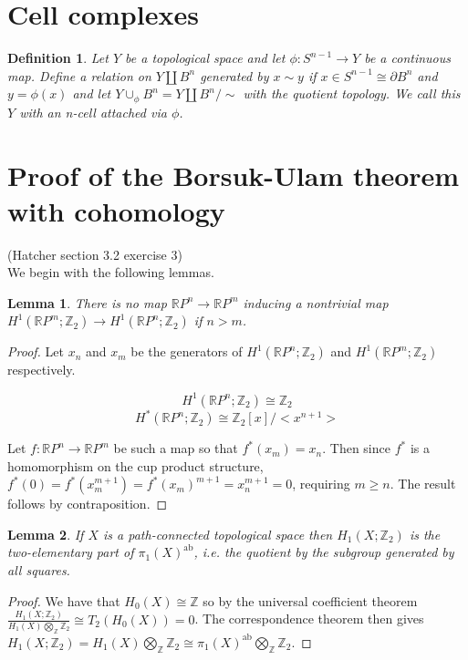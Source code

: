 \documentclass{report}
\newtheorem{definition}{Definition}
\newtheorem{lemma}{Lemma}
\begin{document}
\section{Cell complexes}
\begin{definition}
Let $Y$ be a topological space and let $\phi\colon S^{n-1}\to Y$ be a continuous map. Define a relation on $Y\coprod B^n$ generated by $x\sim y$ if $x\in S^{n-1}\cong\partial B^n$ and $y=\phi(x)$ and let $Y\cup_\phi B^n=Y\coprod B^n/\sim$ with the quotient topology. We call this $Y$ with an n-cell attached via $\phi$.
\end{definition}


\section{Proof of the Borsuk-Ulam theorem with cohomology}

\textrm{(Hatcher section 3.2 exercise 3) \\}
We begin with the following lemmas.

\begin{lemma}
There is no map $\mathbb{R} P^n$$\rightarrow$$\mathbb{R} P^m$ inducing a nontrivial map $H^1(\mathbb{R} P^m;\mathbb{Z}_2)\rightarrow H^1(\mathbb{R} P^n;\mathbb{Z}_2)$ if $n>m$.
\end{lemma}
\begin{proof}
Let $x_n$ and $x_m$ be the generators of $H^1(\mathbb{R} P^n;\mathbb{Z}_2)$ and $H^1(\mathbb{R} P^m;\mathbb{Z}_2)$ respectively.

\[H^1(\mathbb{R} P^n;\mathbb{Z}_2)\cong \mathbb{Z}_2\] 
\[H^*(\mathbb{R} P^n;\mathbb{Z}_2)\cong \mathbb{Z}_2[x]/<x^{n+1}>\] 

\noindent Let $f\colon\mathbb{R} P^n\to\mathbb{R} P^m $ be such a map so that $f^*(x_m)=x_n$.
Then since $f^*$ is a homomorphism on the cup product structure, $f^*(0)=f^*(x_m^{m+1})=f^*(x_m)^{m+1}=x_n^{m+1}=0$, requiring $m \geq n$. The result follows by contraposition.
\end{proof}

\begin{lemma}
If $X$ is a path-connected topological space then $H_1(X;\mathbb{Z}_2)$ is the two-elementary part of $\pi_1(X)^{\text{ab}}$, i.e. the quotient by the subgroup generated by all squares.
\end{lemma}
\begin{proof}
We have that $H_0(X)\cong\mathbb{Z}$ so by the universal coefficient theorem $\frac{H_1(X;\mathbb{Z}_2)}{H_1(X)\bigotimes_\mathbb{Z}\mathbb{Z}_2}\cong T_2(H_0(X))=0$. The correspondence theorem then gives $H_1(X;\mathbb{Z}_2)=H_1(X)\bigotimes_\mathbb{Z}\mathbb{Z}_2\cong\pi_1(X)^{\text{ab}}\bigotimes_\mathbb{Z}\mathbb{Z}_2$.
\end{proof}
\end{document}
